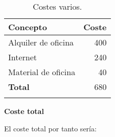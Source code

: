 \begin{longtable}[]{@{}lr@{}}
	\toprule
	\begin{minipage}[b]{0.48\columnwidth}\raggedright\strut
		\textbf{Concepto}\strut
	\end{minipage} & \begin{minipage}[b]{0.18\columnwidth}\raggedright\strut
		\textbf{Coste}\strut
	\end{minipage}\tabularnewline
	\midrule
	\endhead
	\begin{minipage}[t]{0.48\columnwidth}\raggedright\strut
		Alquiler de oficina\strut
	\end{minipage} & \begin{minipage}[t]{0.18\columnwidth}\raggedright\strut
		400 \officialeuro\strut
	\end{minipage}\tabularnewline
	\begin{minipage}[t]{0.48\columnwidth}\raggedright\strut
		Internet\strut
	\end{minipage} & \begin{minipage}[t]{0.18\columnwidth}\raggedright\strut
		240 \officialeuro\strut
	\end{minipage}\tabularnewline
	\begin{minipage}[t]{0.48\columnwidth}\raggedright\strut
		Material de oficina\strut
	\end{minipage} & \begin{minipage}[t]{0.18\columnwidth}\raggedright\strut
		40 \officialeuro\strut
	\end{minipage}\tabularnewline
	\midrule
	\begin{minipage}[t]{0.48\columnwidth}\raggedright\strut
		\textbf{Total}\strut
	\end{minipage} & \begin{minipage}[t]{0.18\columnwidth}\raggedright\strut
		680 \officialeuro\strut
	\end{minipage}\tabularnewline
	\bottomrule
	\caption{Costes varios.}
\end{longtable}

\textbf{Coste total}

El coste total por tanto sería:\\

